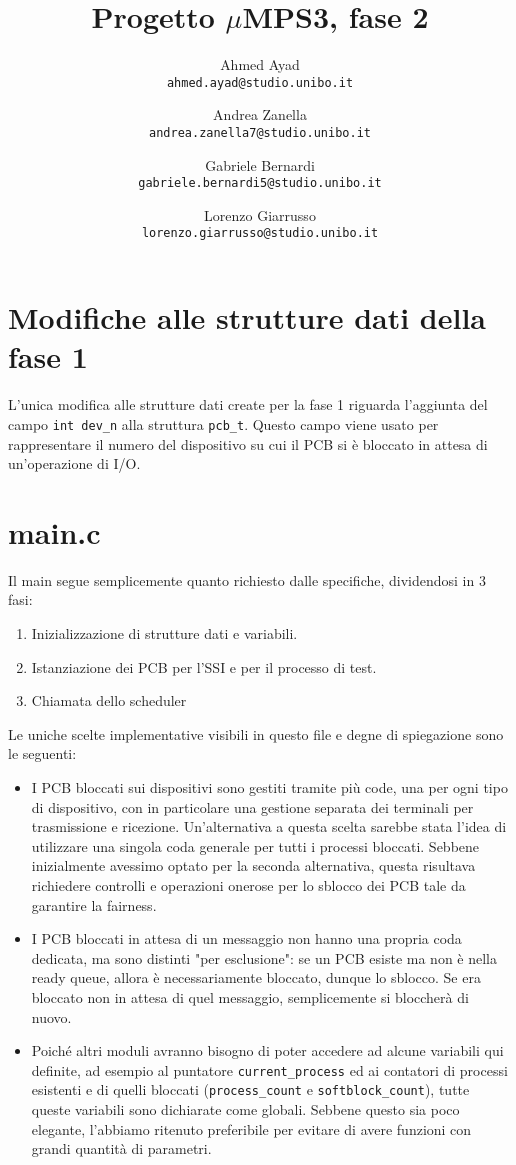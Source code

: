 \documentclass[a4paper]{article}
\title{Progetto $\mu$MPS3, fase 2}
\author{
 Ahmed Ayad\\
  \texttt{ahmed.ayad@studio.unibo.it}
  \and
  Andrea Zanella\\
  \texttt{andrea.zanella7@studio.unibo.it}
  \and
  Gabriele Bernardi\\
  \texttt{gabriele.bernardi5@studio.unibo.it}
  \and
  Lorenzo Giarrusso\\
  \texttt{lorenzo.giarrusso@studio.unibo.it}
}
\begin{document}
\maketitle
\pagebreak
\tableofcontents
\pagebreak

\section{Modifiche alle strutture dati della fase 1}
L'unica modifica alle strutture dati create per la fase 1 riguarda l'aggiunta del campo \verb+int dev_n+ alla struttura \verb+pcb_t+. Questo campo viene
usato per rappresentare il numero del dispositivo su cui il PCB si è bloccato in attesa di un'operazione di I/O.

\section{main.c}
Il main segue semplicemente quanto richiesto dalle specifiche, dividendosi in 3 fasi:
\begin{enumerate}
	\item Inizializzazione di strutture dati e variabili.
	\item Istanziazione dei PCB per l'SSI e per il processo di test.
	\item Chiamata dello scheduler
\end{enumerate}
Le uniche scelte implementative visibili in questo file e degne di spiegazione sono le seguenti:
\begin{itemize}  
	\item I PCB bloccati sui dispositivi sono gestiti tramite più code, una per ogni tipo di dispositivo, con in particolare una gestione separata dei terminali 
		per trasmissione e ricezione. Un'alternativa a questa scelta sarebbe stata l'idea di utilizzare una singola coda generale per tutti i processi bloccati.
		Sebbene inizialmente avessimo optato per la seconda alternativa, questa risultava richiedere controlli e operazioni onerose per lo sblocco dei PCB 
		tale da garantire la fairness.
	\item I PCB bloccati in attesa di un messaggio non hanno una propria coda dedicata, ma sono distinti "per esclusione": se un PCB esiste ma non è nella
		ready queue, allora è necessariamente bloccato, dunque lo sblocco. Se era bloccato non in attesa di quel messaggio, semplicemente si 
		bloccherà di nuovo.
	\item Poiché altri moduli avranno bisogno di poter accedere ad alcune variabili qui definite, ad esempio al puntatore \verb+current_process+ ed ai 
		contatori di processi esistenti e di quelli bloccati (\verb+process_count+ e \verb+softblock_count+), tutte queste variabili sono dichiarate come 
		globali. Sebbene questo sia poco elegante, l'abbiamo ritenuto preferibile per evitare di avere funzioni con grandi quantità di parametri.
\end{itemize}
\end{document}
